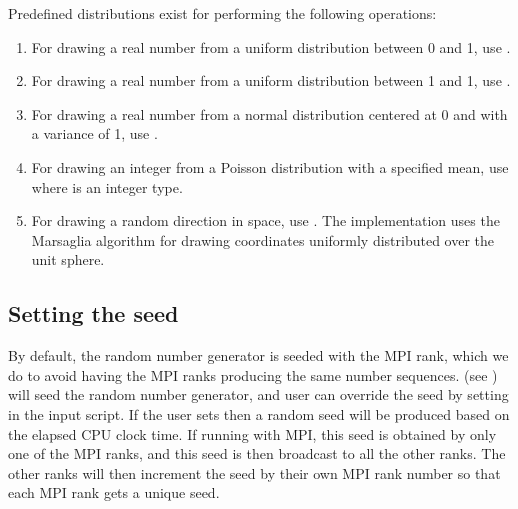 \documentclass[letterpaper,10pt,english]{sphinxmanual}
\begin{document}
Pre\sphinxhyphen{}defined distributions exist for performing the following operations:
\begin{enumerate}
%
\item {} 
For drawing a real number from a uniform distribution between 0 and 1, use .

\item {} 
For drawing a real number from a uniform distribution between \sphinxhyphen{}1 and 1, use .

\item {} 
For drawing a real number from a normal distribution centered at 0 and with a variance of 1, use .

\item {} 
For drawing an integer from a Poisson distribution with a specified mean, use  where  is an integer type.

\item {} 
For drawing a random direction in space, use .
The implementation uses the Marsaglia algorithm for drawing coordinates uniformly distributed over the unit sphere.

\end{enumerate}


\subsection{Setting the seed}
\label{\detokenize{Utilities/RandomNumbers:setting-the-seed}}
By default, the random number generator is seeded with the MPI rank, which we do to avoid having the MPI ranks producing the same number sequences.
 (see {\hyperref[\detokenize{Source/Driver:chap-driver}]{}}) will seed the random number generator, and user can override the seed by setting  in the input script.
If the user sets  then a random seed will be produced based on the elapsed CPU clock time.
If running with MPI, this seed is obtained by only one of the MPI ranks, and this seed is then broadcast to all the other ranks.
The other ranks will then increment the seed by their own MPI rank number so that each MPI rank gets a unique seed.
\end{document}
